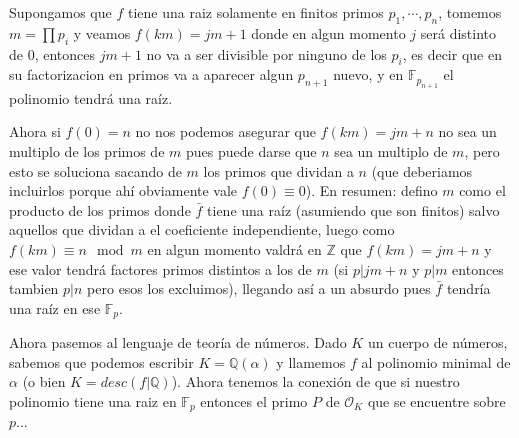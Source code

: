 \documentclass[12pt]{amsart}
\newcommand{\QQ}{\mathbb{Q}}
\newcommand{\ZZ}{\mathbb{Z}}
\newcommand{\FF}{\mathbb{F}}
\newcommand{\OO}{\mathcal{O}}
\theoremstyle{plain}
\begin{document}
Supongamos que $f$ tiene una raiz solamente en finitos primos $p_1,
\cdots, p_n$, tomemos $m=\prod p_i$ y veamos $f(km) = jm+1$ donde en
algun momento $j$ será distinto de 0, entonces $jm+1$ no va a ser 
divisible por ninguno de los $p_i$, es decir que en su factorizacion 
en primos va a aparecer algun $p_{n+1}$ nuevo, y en $\FF_{p_{n+1}}$
el polinomio tendrá una raíz.

Ahora si $f(0) = n$ no nos podemos asegurar que $f(km) = jm+n$ no 
sea un multiplo de los primos de $m$ pues puede darse que $n$ sea un
multiplo de $m$, pero esto se soluciona sacando de $m$ los primos que 
dividan a $n$ (que deberiamos incluirlos porque ahí obviamente vale 
$f(0)\equiv 0$). En resumen: defino $m$ como el producto de los primos
donde $\bar{f}$ tiene una raíz (asumiendo que son finitos) salvo 
aquellos que dividan a el coeficiente independiente, luego como 
$f(km) \equiv n \mod m$ en algun momento valdrá en $\ZZ$ que 
$f(km) = jm+n$ y ese valor tendrá factores primos distintos a los de 
$m$ (si $p|jm+n$ y $p|m$ entonces tambien $p|n$ pero esos los 
excluimos), llegando así a un absurdo pues $\bar{f}$ tendría una raíz 
en ese $\FF_p$.

Ahora pasemos al lenguaje de teoría de números. Dado $K$ un cuerpo de 
números, sabemos que podemos escribir $K=\QQ(\alpha)$ y llamemos $f$ al
polinomio minimal de $\alpha$ (o bien $K=desc(f|\QQ)$). Ahora tenemos la
conexión de que si nuestro polinomio tiene una raiz en $\FF_p$ 
entonces el primo $P$ de $\OO_K$ que se encuentre sobre $p$...
\end{document}
